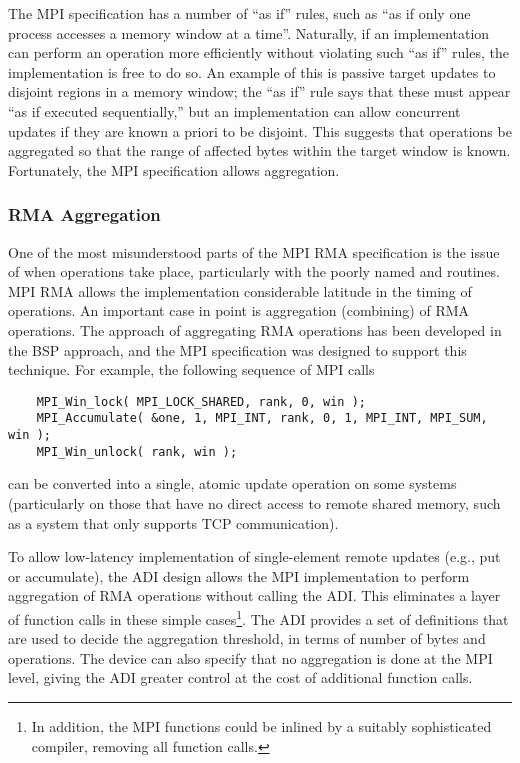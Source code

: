 The MPI specification has a number of ``as if'' rules, such as ``as if
only one process accesses a memory window at a time''.  Naturally, if
an implementation can perform an operation more efficiently without
violating such ``as if'' rules, the implementation is free to do so.
An example of this is passive target updates to disjoint regions in a
memory window; 
the ``as if'' rule says that these must appear ``as if executed
sequentially,'' but an implementation can allow concurrent updates if
they are known a priori to be disjoint.  This suggests that operations
be aggregated so that the range of affected bytes within the target
window is known.  Fortunately, the MPI specification allows aggregation.

\subsubsection{RMA Aggregation}
One of the most misunderstood parts of the MPI RMA specification is
the issue of when operations take place, particularly with the poorly
named  and  routines.  MPI RMA
allows the implementation considerable latitude in the timing of
operations.  An important case in point is aggregation (combining) of RMA
operations.  The approach of aggregating RMA operations has been
developed in the BSP approach, and the MPI specification was designed
to support this technique.  For example, the following sequence of MPI
calls

\begin{small}
\begin{verbatim}
    MPI_Win_lock( MPI_LOCK_SHARED, rank, 0, win );
    MPI_Accumulate( &one, 1, MPI_INT, rank, 0, 1, MPI_INT, MPI_SUM, win );
    MPI_Win_unlock( rank, win );
\end{verbatim}
\end{small}

\noindent
can be converted into a single, atomic update operation on some
systems (particularly on those that have no direct access to remote
shared memory, such as a system that only supports TCP communication).

To allow low-latency implementation of single-element remote updates
(e.g., put or accumulate), the ADI design allows the MPI
implementation to perform aggregation of RMA operations without
calling the ADI.  This eliminates a layer of function calls in these
simple cases\footnote{In addition, the MPI functions could be inlined by a
  suitably sophisticated compiler,
removing all function calls.}.  
The ADI provides a set of definitions
that are used to decide the aggregation threshold, in terms of number
of bytes and operations.  The device can also specify that no
aggregation is done at the MPI level, giving the ADI greater control
at the cost of additional function calls.
%
%

